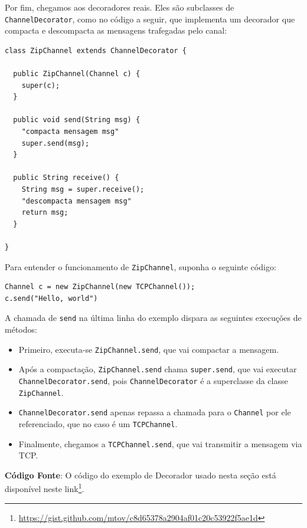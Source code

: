 \documentclass[
  11pt,
  twoside]{book}
\newcommand{\passthrough}[1]{#1}
\DeclareRobustCommand{\href}[2]{#2\footnote{\url{#1}}}
\begin{document}
Por fim, chegamos aos decoradores reais. Eles são subclasses de
\passthrough{\lstinline!ChannelDecorator!}, como no código a seguir, que
implementa um decorador que compacta e descompacta as mensagens
trafegadas pelo canal:

\begin{lstlisting}
class ZipChannel extends ChannelDecorator {

  public ZipChannel(Channel c) {
    super(c);
  }  

  public void send(String msg) {
    "compacta mensagem msg"
    super.send(msg);
  }

  public String receive() {
    String msg = super.receive();
    "descompacta mensagem msg"
    return msg;
  }

}
\end{lstlisting}

Para entender o funcionamento de \passthrough{\lstinline!ZipChannel!},
suponha o seguinte código:

\begin{lstlisting}
Channel c = new ZipChannel(new TCPChannel());
c.send("Hello, world")
\end{lstlisting}

A chamada de \passthrough{\lstinline!send!} na última linha do exemplo
dispara as seguintes execuções de métodos:

\begin{itemize}
\item
  Primeiro, executa-se \passthrough{\lstinline!ZipChannel.send!}, que
  vai compactar a mensagem.
\item
  Após a compactação, \passthrough{\lstinline!ZipChannel.send!} chama
  \passthrough{\lstinline!super.send!}, que vai executar
  \passthrough{\lstinline!ChannelDecorator.send!}, pois
  \passthrough{\lstinline!ChannelDecorator!} é a superclasse da classe
  \passthrough{\lstinline!ZipChannel!}.
\item
  \passthrough{\lstinline!ChannelDecorator.send!} apenas repassa a
  chamada para o \passthrough{\lstinline!Channel!} por ele referenciado,
  que no caso é um \passthrough{\lstinline!TCPChannel!}.
\item
  Finalmente, chegamos a \passthrough{\lstinline!TCPChannel.send!}, que
  vai transmitir a mensagem via TCP.
\end{itemize}

\textbf{Código Fonte}: O código do exemplo de Decorador usado nesta
seção está disponível neste
\href{https://gist.github.com/mtov/c8d65378a2904af01c20c53922f5ae1d}{link}.
\end{document}
